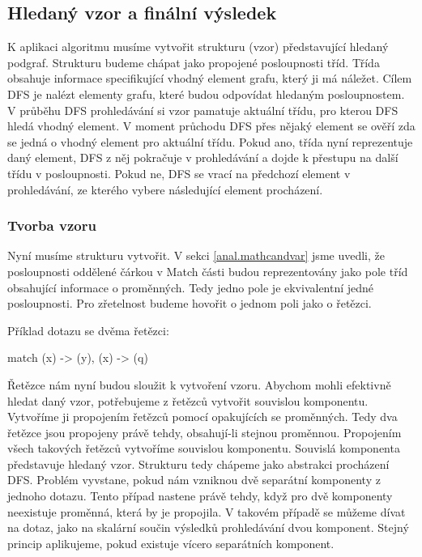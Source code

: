 \subsection{Hledaný vzor a finální výsledek} \label{anal.match.res}

K aplikaci algoritmu musíme vytvořit strukturu (vzor) představující hledaný podgraf.
Strukturu budeme chápat jako propojené posloupnosti tříd.
Třída obsahuje informace specifikující vhodný element grafu, který ji má náležet.
Cílem DFS je nalézt elementy grafu, které budou odpovídat hledaným posloupnostem.
V průběhu DFS prohledávání si vzor pamatuje aktuální třídu, pro kterou DFS hledá vhodný element.
V moment průchodu DFS přes nějaký element se ověří zda se jedná o vhodný element pro aktuální třídu.
Pokud ano, třída nyní reprezentuje daný element, DFS z něj pokračuje v prohledávání a dojde k přestupu na další třídu v posloupnosti.
Pokud ne, DFS se vrací na předchozí element v prohledávání, ze kterého vybere následující element procházení.

\subsubsection{Tvorba vzoru}

Nyní musíme strukturu vytvořit.
V sekci \ref{anal.mathcandvar} jsme uvedli, že posloupnosti oddělené čárkou v Match části budou reprezentovány jako pole tříd obsahující informace o proměnných.
Tedy jedno pole je ekvivalentní jedné posloupnosti.
Pro zřetelnost budeme hovořit o jednom poli jako o řetězci.

Příklad dotazu se dvěma řetězci:
\begin{code}
match (x) -> (y), (x) -> (q)
\end{code}

Řetězce nám nyní budou sloužit k vytvoření vzoru.
Abychom mohli efektivně hledat daný vzor, potřebujeme z řetězců vytvořit souvislou komponentu.
Vytvoříme ji propojením řetězců pomocí opakujících se proměnných.
Tedy dva řetězce jsou propojeny právě tehdy, obsahují-li stejnou proměnnou. 
Propojením všech takových řetězců vytvoříme souvislou komponentu.
Souvislá komponenta představuje hledaný vzor.
Strukturu tedy chápeme jako abstrakci procházení DFS.
Problém vyvstane, pokud nám vzniknou dvě separátní komponenty z jednoho dotazu.
Tento případ nastene právě tehdy, když pro dvě komponenty neexistuje proměnná, která by je propojila.
V takovém případě se můžeme dívat na dotaz, jako na skalární součin výsledků prohledávání dvou komponent.
Stejný princip aplikujeme, pokud existuje vícero separátních komponent.

